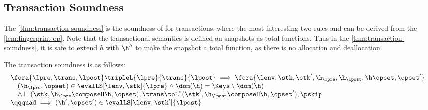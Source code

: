 \subsection{Transaction Soundness}

The \cref{thm:transaction-soundness} is the soundness of for transactions, where the most interesting two rules  and  can be derived from the \cref{lem:fingerprint-op}.
Note that the transactional semantics is defined on snapshots as total functions.
Thus in the \cref{thm:transaction-soundness}, it is safe to extend \( h \) with \( \h'' \)  to make the snapshot a total function, as there is no allocation and deallocation.

\begin{theorem}
\label{thm:transaction-soundness}
The transaction soundness is as follows:
\[
    \begin{array}{@{}l@{}}
        \fora{ \lpre, \trans, \lpost } \tripleL{\lpre}{\trans}{\lpost}
        \implies 
        \fora{\lenv, \stk, \stk', \h_\lpre, \h_\lpost, \h \opset, \opset' }  \\
        \quad (\h_\lpre, \opset) \in \evalLS[\lenv, \stk]{\lpre}
        \land \dom(\h) = \Keys \setminus \dom(\h) \\
        \quad {} \land \vdash (\stk, \h_\lpre \composeH \h, \opset ), \trans \toL^{*}  (\stk', \h_\lpost \composeH \h, \opset' ), \pskip  \\
        \qqquad \implies (\h', \opset') \in \evalLS[\lenv, \stk']{\lpost}
    \end{array}
\]
\end{theorem}
